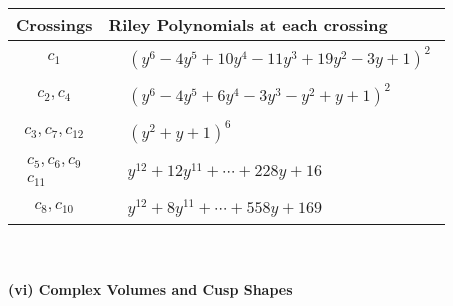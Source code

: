 \documentclass[1p]{elsarticle_modified}
\theoremstyle{definition}
\begin{document}
\begin{tabular}{m{50pt}|m{274pt}}
Crossings & \hspace{64pt}Riley Polynomials at each crossing \\
\hline $$\begin{aligned}c_{1}\end{aligned}$$&$\begin{aligned}
&(y^6-4 y^5+10 y^4-11 y^3+19 y^2-3 y+1)^2
\end{aligned}$\\
\hline $$\begin{aligned}c_{2},c_{4}\end{aligned}$$&$\begin{aligned}
&(y^6-4 y^5+6 y^4-3 y^3- y^2+y+1)^2
\end{aligned}$\\
\hline $$\begin{aligned}c_{3},c_{7},c_{12}\end{aligned}$$&$\begin{aligned}
&(y^2+y+1)^6
\end{aligned}$\\
\hline $$\begin{aligned}c_{5},c_{6},c_{9}\\c_{11}\end{aligned}$$&$\begin{aligned}
&y^{12}+12 y^{11}+\cdots+228 y+16
\end{aligned}$\\
\hline $$\begin{aligned}c_{8},c_{10}\end{aligned}$$&$\begin{aligned}
&y^{12}+8 y^{11}+\cdots+558 y+169
\end{aligned}$\\
\hline
\end{tabular}\\~\\
\newpage\flushleft \textbf{(vi) Complex Volumes and Cusp Shapes}
\end{document}
